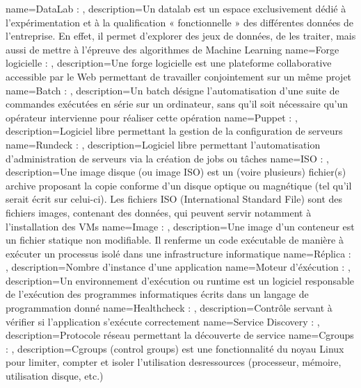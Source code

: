 {
    name=DataLab : ,
    description={Un datalab est un espace exclusivement dédié à l’expérimentation et à la qualification « fonctionnelle » des différentes données de l’entreprise. En effet, il permet d’explorer des jeux de données, de les traiter, mais aussi de mettre à l’épreuve des algorithmes de Machine Learning}
}
{
    name=Forge logicielle : ,
    description={Une forge logicielle est une plateforme collaborative accessible par le Web permettant de travailler conjointement sur un même projet}
}
{
    name=Batch : ,
    description={Un batch désigne l’automatisation d’une suite de commandes exécutées en série sur un ordinateur, sans qu’il soit nécessaire qu’un opérateur intervienne pour réaliser cette opération}
}
{
    name=Puppet : ,
    description={Logiciel libre permettant la gestion de la configuration de serveurs}
}
{
    name=Rundeck : ,
    description={Logiciel libre permettant l’automatisation d’administration de serveurs via la création de jobs ou tâches}
}
{
    name=ISO : ,
    description={Une image disque (ou image ISO) est un (voire plusieurs) fichier(s) archive proposant la copie conforme d'un disque optique ou magnétique (tel qu'il serait écrit sur celui-ci). Les fichiers ISO (International Standard File) sont des fichiers images, contenant des données, qui peuvent servir notamment à l’installation des VMs}
}
{
    name=Image : ,
    description={Une image d'un conteneur est un fichier statique non modifiable. Il renferme un code exécutable de manière à exécuter un processus isolé dans une infrastructure informatique}
}
{
    name=Réplica : ,
    description={Nombre d’instance d’une application}
}
{
    name=Moteur d'éxécution : ,
    description={Un environnement d’exécution ou runtime est un logiciel responsable de l’exécution des programmes informatiques écrits dans un langage de programmation donné}
}
{
    name=Healthcheck : ,
    description={Contrôle servant à vérifier si l’application s’exécute correctement}
}
{
    name=Service Discovery : ,
    description={Protocole réseau permettant la découverte de service}
}
{
    name=Cgroups : ,
    description={Cgroups (control groups) est une fonctionnalité du noyau Linux pour limiter, compter et isoler l’utilisation desressources (processeur, mémoire, utilisation disque, etc.)}
}
